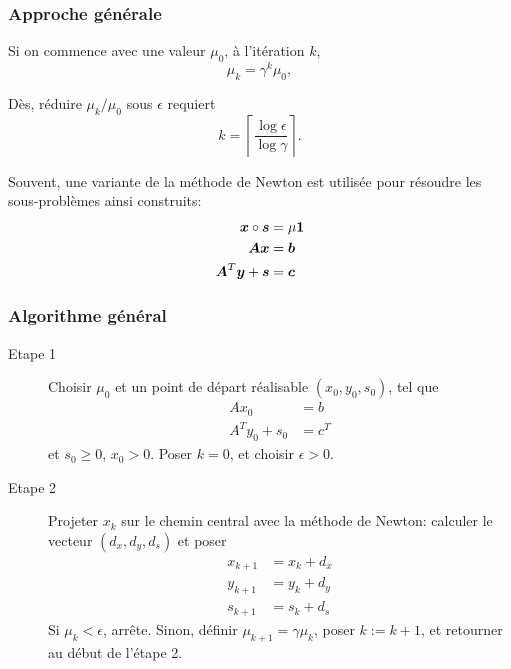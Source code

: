 \documentclass[usepdftitle=false, aspectratio=169]{beamer}
\begin{document}
\begin{frame}
	\frametitle{Approche générale}
	
	Si on commence avec une valeur $\mu_0$, à l'itération $k$,
	\[
	\mu_{k} = \gamma^k \mu_0,
	\]
	
	\mbox{}
	
	Dès, réduire $\mu_k/\mu_0$ sous $\epsilon$ requiert
	\[
	k = \left\lceil \frac{\log \epsilon}{\log \gamma} \right\rceil.
	\]
	
	\mbox{}
	
	Souvent, une variante de la méthode de Newton est utilisée pour résoudre les sous-problèmes ainsi construits:
	\begin{align*}
		{\boldsymbol{x}} \circ {\boldsymbol{s}} &= \mu {\boldsymbol{1}} \\
		{\boldsymbol{A}}{\boldsymbol{x}} &= {\boldsymbol{b}} \\
		{\boldsymbol{A}}^T{\boldsymbol{y}} + {\boldsymbol{s}} & = {\boldsymbol{c}}
	\end{align*}
	
\end{frame}

\begin{frame}
	\frametitle{Algorithme général}
	
	\begin{description}
		\item[Etape 1]
		Choisir $\mu_0$ et un point de départ réalisable $(x_0, y_0, s_0)$, tel que
		\begin{align*}
			Ax_0 &= b \\
			A^Ty_0 + s_0 &= c^T
		\end{align*}
		et $s_0 \geq 0$, $x_0 > 0$. Poser $k = 0$, et choisir $\epsilon > 0$.
		\item[Etape 2]
		Projeter $x_k$ sur le chemin central avec la méthode de Newton: calculer le vecteur $(d_x, d_y, d_s)$ et poser
		\begin{align*}
			x_{k+1} &= x_k + d_x \\
			y_{k+1} &= y_k + d_y \\
			s_{k+1} &= s_k + d_s
		\end{align*}
		Si $\mu_k < \epsilon$, arrête.
		Sinon, définir $\mu_{k + 1} = \gamma \mu_k$, poser $k := k+1$, et retourner au début de l'étape 2.
	\end{description}
	
\end{frame}
\end{document}
